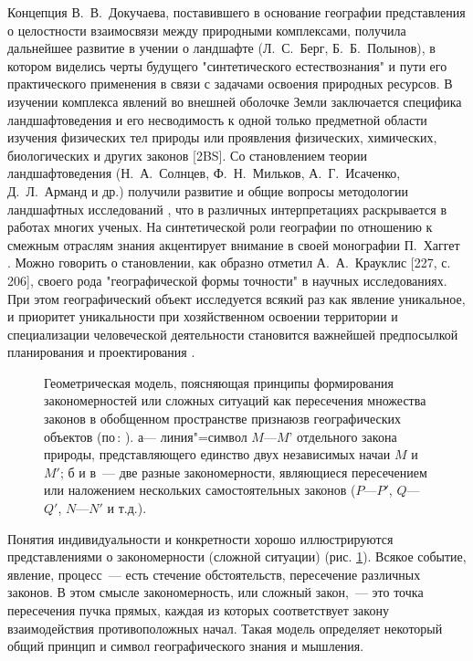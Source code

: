 \documentclass[14pt,draft,openany]{extbook}
\begin{document}
Концепция В.~В.~Докучаева, поставившего в основание географии представления о целостности взаимосвязи между природными комплексами, получила дальнейшее развитие в учении о ландшафте (Л.~С.~Берг, Б.~Б.~Полынов), в котором виделись черты будущего "синтетического естествознания" и пути его практического применения в связи с задачами освоения природных ресурсов. В изучении комплекса явлений во внешней оболочке Земли заключается специфика ландшафтоведения и его несводимость к одной только предметной области изучения физических тел природы или проявления физических, химических, биологических и других законов [2BS]. Со становлением теории ландшафтоведения (Н.~А.~Солнцев, Ф.~Н.~Мильков, А.~Г.~Исаченко, Д.~Л.~Арманд и др.) получили развитие и общие вопросы методологии ландшафтных исследований \cite{b288}, что в различных интерпретациях раскрывается в работах многих ученых. На синтетической роли географии по отношению к смежным отраслям знания акцентирует внимание в своей монографии П.~Хаггет \cite{b450}. Можно говорить о становлении, как образно отметил А.~А.~Крауклис [227, с. 206], своего рода "географической формы точности" в научных исследованиях. При этом географический объект исследуется всякий раз как явление уникальное, и приоритет уникальности при хозяйственном освоении территории и специализации человеческой деятельности становится важнейшей предпосылкой планирования и проектирования \cite{b351}.

\begin{figure}
\caption{Геометрическая модель, поясняющая принципы формирования закономерностей или сложных ситуаций как пересечения множества законов в обобщенном пространстве признаюзв географических объектов (по\,: \cite{b24}).  а--- линия"=символ $M$---$M$' отдельного закона природы, представляющего единство двух независимых начаи $M$ и $M'$; б и в~--- две разные закономерности, являющиеся пересечением или наложением нескольких самостоятельных законов ($P$---$P'$, $Q$---$Q'$, $N$---$N'$ и т.д.).}\label{pic:intro:1}
\end{figure}


Понятия индивидуальности и конкретности хорошо иллюстрируются представлениями о закономерности (сложной ситуации) (рис. \ref{pic:intro:1}). Всякое событие, явление, процесс~--- есть стечение обстоятельств, пересечение различных законов. В этом смысле закономерность, или сложный закон,~--- это точка пересечения пучка прямых, каждая из которых соответствует закону взаимодействия противоположных начал. Такая модель определяет некоторый общий принцип и символ географического знания и мышления.
\end{document}
